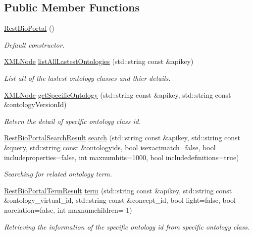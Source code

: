 \subsection*{Public Member Functions}
\begin{DoxyCompactItemize}
\item 
\hyperlink{classunisys_1_1RestBioPortal_a149c09fcddb96ef4cc6ae4be1396613b}{Rest\-Bio\-Portal} ()
\begin{DoxyCompactList}\small\item\em Default constructor. \end{DoxyCompactList}\item 
\hyperlink{structXMLNode}{X\-M\-L\-Node} \hyperlink{classunisys_1_1RestBioPortal_a069c59631f0007cf347cc473e38a4c85}{list\-All\-Lastest\-Ontologies} (std\-::string const \&apikey)
\begin{DoxyCompactList}\small\item\em List all of the lastest ontology classes and thier details. \end{DoxyCompactList}\item 
\hyperlink{structXMLNode}{X\-M\-L\-Node} \hyperlink{classunisys_1_1RestBioPortal_a23181747eee2610741b8388efe8c1adb}{get\-Specific\-Ontology} (std\-::string const \&apikey, std\-::string const \&ontology\-Version\-Id)
\begin{DoxyCompactList}\small\item\em Retern the detail of specific ontology class id. \end{DoxyCompactList}\item 
\hyperlink{classunisys_1_1RestBioPortalSearchResult}{Rest\-Bio\-Portal\-Search\-Result} \hyperlink{classunisys_1_1RestBioPortal_ac9df074500973674dd6995aa1f20eff0}{search} (std\-::string const \&apikey, std\-::string const \&query, std\-::string const \&ontologyids, bool isexactmatch=false, bool includeproperties=false, int maxnumhits=1000, bool includedefinitions=true)
\begin{DoxyCompactList}\small\item\em Searching for related ontology term. \end{DoxyCompactList}\item 
\hyperlink{classunisys_1_1RestBioPortalTermResult}{Rest\-Bio\-Portal\-Term\-Result} \hyperlink{classunisys_1_1RestBioPortal_a606b15f2e8c10c60012347d52dd67270}{term} (std\-::string const \&apikey, std\-::string const \&ontology\-\_\-virtual\-\_\-id, std\-::string const \&concept\-\_\-id, bool light=false, bool norelation=false, int maxnumchildren=-\/1)
\begin{DoxyCompactList}\small\item\em Retrieving the information of the specific ontology id from specific ontology class. \end{DoxyCompactList}\end{DoxyCompactItemize}

